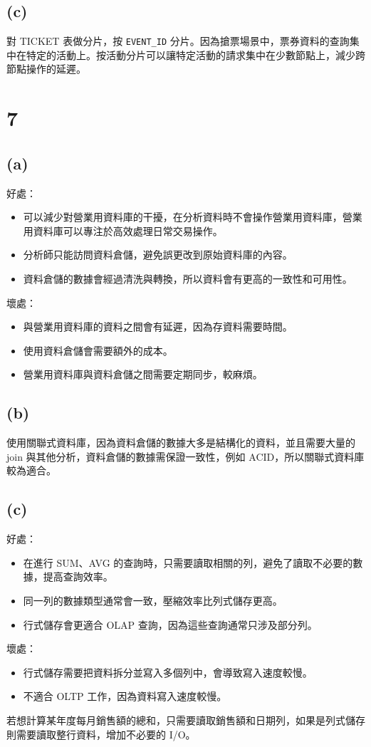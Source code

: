 \documentclass{article}
\begin{document}
\subsection*{(c)}
對 TICKET 表做分片，按 \texttt{EVENT\_ID} 分片。因為搶票場景中，票券資料的查詢集中在特定的活動上。按活動分片可以讓特定活動的請求集中在少數節點上，減少跨節點操作的延遲。


\section*{7}
\subsection*{(a)}
\noindent 好處：
\begin{itemize}
    \item 可以減少對營業用資料庫的干擾，在分析資料時不會操作營業用資料庫，營業用資料庫可以專注於高效處理日常交易操作。
    \item 分析師只能訪問資料倉儲，避免誤更改到原始資料庫的內容。
    \item 資料倉儲的數據會經過清洗與轉換，所以資料會有更高的一致性和可用性。
\end{itemize}

\noindent 壞處：
\begin{itemize}
    \item 與營業用資料庫的資料之間會有延遲，因為存資料需要時間。
    \item 使用資料倉儲會需要額外的成本。
    \item 營業用資料庫與資料倉儲之間需要定期同步，較麻煩。
\end{itemize}

\subsection*{(b)}
使用關聯式資料庫，因為資料倉儲的數據大多是結構化的資料，並且需要大量的 join 與其他分析，資料倉儲的數據需保證一致性，例如 ACID，所以關聯式資料庫較為適合。

\subsection*{(c)}
\noindent 好處：
\begin{itemize}
    \item 在進行 SUM、AVG 的查詢時，只需要讀取相關的列，避免了讀取不必要的數據，提高查詢效率。
    \item 同一列的數據類型通常會一致，壓縮效率比列式儲存更高。
    \item 行式儲存會更適合 OLAP 查詢，因為這些查詢通常只涉及部分列。
\end{itemize}
\noindent 壞處：
\begin{itemize}
    \item 行式儲存需要把資料拆分並寫入多個列中，會導致寫入速度較慢。
    \item 不適合 OLTP 工作，因為資料寫入速度較慢。
\end{itemize}
若想計算某年度每月銷售額的總和，只需要讀取銷售額和日期列，如果是列式儲存則需要讀取整行資料，增加不必要的 I/O。
\end{document}

